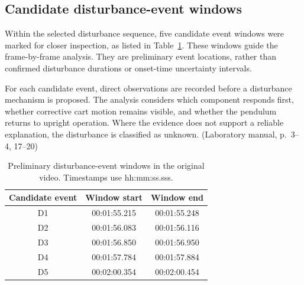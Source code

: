 \documentclass[11pt,a4paper]{article}
\newcommand{\manual}[1]{(Laboratory manual, p.~#1)}
\begin{document}
\subsection{Candidate disturbance-event windows}
\label{sec:disturbance-windows}

Within the selected disturbance sequence, five candidate
event windows were marked for closer inspection, as listed
in Table~\ref{tab:disturbance-windows}.
These windows guide the frame-by-frame analysis.
They are preliminary event locations, rather than confirmed
disturbance durations or onset-time uncertainty intervals.

For each candidate event, direct observations are recorded
before a disturbance mechanism is proposed. The analysis
considers which component responds first, whether corrective
cart motion remains visible, and whether the pendulum returns
to upright operation. Where the evidence does not support a
reliable explanation, the disturbance is classified as unknown.
\manual{3--4, 17--20}

\begin{table}[htbp]
    \centering
    \small
    \caption{Preliminary disturbance-event windows in the
    original video. Timestamps use hh:mm:ss.sss.}
    \label{tab:disturbance-windows}
    \begin{tabular}{@{}ccc@{}}
        \toprule
        Candidate event & Window start & Window end \\
        \midrule
        D1 & 00:01:55.215 & 00:01:55.248 \\
        D2 & 00:01:56.083 & 00:01:56.116 \\
        D3 & 00:01:56.850 & 00:01:56.950 \\
        D4 & 00:01:57.784 & 00:01:57.884 \\
        D5 & 00:02:00.354 & 00:02:00.454 \\
        \bottomrule
    \end{tabular}
\end{table}
\end{document}
